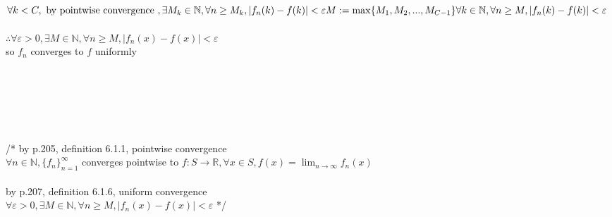 \documentclass[12pt, border = 4pt, multi]{article} %
\begin{document}
\\
$\forall k < C, \text{ by pointwise convergence }, \exists M_k \in \mathbb{N}, \forall n \geq M_k, |f_n(k) - f(k)| < \varepsilon\\
M := \max\{M_1, M_2, ..., M_{C - 1}\}\\
\forall k \in \mathbb{N}, \forall n \geq M, |f_n(k) - f(k)| < \varepsilon$\\
\\
$\therefore \forall \varepsilon > 0, \exists M \in \mathbb{N}, \forall n \geq M, |f_n(x) - f(x)| < \varepsilon$\\
so $f_n$ converges to $f$ uniformly\\
\\
\\
\\
\\
\\
\\
/* by p.205, definition 6.1.1, pointwise convergence\\
$\forall n \in \mathbb{N}, \{f_n\}_{n = 1} ^ {\infty}$ converges pointwise to $f: S \rightarrow \mathbb{R}, \forall x \in S, f(x) = \lim_{n \rightarrow \infty} f_n(x)$\\
\\
by p.207, definition 6.1.6, uniform convergence\\
$\forall \varepsilon > 0, \exists M \in \mathbb{N}, \forall n \geq M, |f_n(x) - f(x)| < \varepsilon$ */\\
\end{document}
